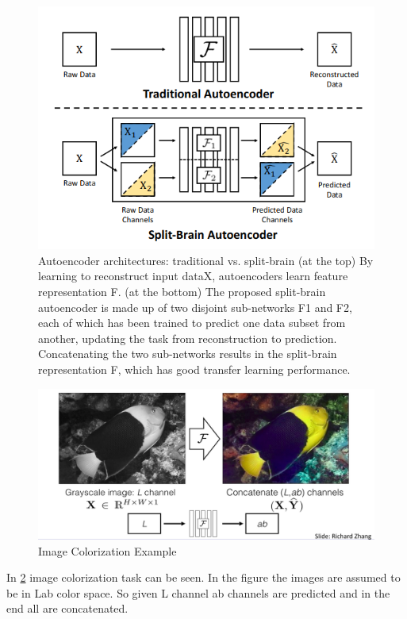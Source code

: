 \documentclass{article}
\begin{document}
\begin{figure}[H]
   \centering
   \includegraphics[width=0.8\linewidth]{figures/cross-channel-ae.png}
   \caption{
      Autoencoder architectures: traditional vs. split-brain
      (at the top)
      By learning to reconstruct input dataX,
      autoencoders learn feature representation F.
      (at the bottom)
      The proposed split-brain autoencoder is made up of 
      two disjoint sub-networks F1 and F2,
      each of which has been trained to predict one
      data subset from another,
      updating the task from reconstruction
      to prediction. 
      Concatenating the two sub-networks results 
      in the split-brain representation F,
      which has good transfer learning performance. }
   \label{fig:split-brain}
   \end{figure}
 
\begin{figure}[H]
       \centering
       \includegraphics[width=0.8\linewidth]{figures/cross-channel-example.png}
       \caption{Image Colorization Example}
       \label{fig:cross-channel-example}
       \end{figure}
 
In \ref{fig:cross-channel-example} image colorization task can be seen.
In the figure the images are assumed to be in Lab color space.
So given L channel ab channels are predicted and in the end all
are concatenated.
 
\end{document}
